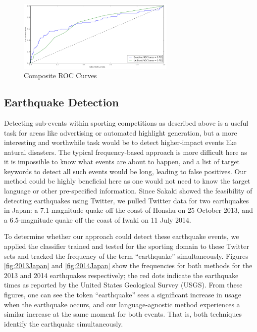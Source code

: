 \documentclass{sig-alternate}
\begin{document}
\begin{figure}[hbtp]
\begin{center}
\includegraphics[width=3in]{./figures/roc_Comp.png}
\caption{Composite ROC Curves}
\label{fig:rocComprehensive}
\end{center}
\end{figure}

\subsection{Earthquake Detection}

Detecting sub-events within sporting competitions as described above is a useful task for areas like advertising or automated highlight generation, but a more interesting and worthwhile task would be to detect higher-impact events like natural disasters.
The typical frequency-based approach is more difficult here as it is impossible to know what events are about to happen, and a list of target keywords to detect all such events would be long, leading to false positives.
Our method could be highly beneficial here as one would not need to know the target language or other pre-specified information.
Since Sakaki showed the feasibility of detecting earthquakes using Twitter, we pulled Twitter data for two earthquakes in Japan: a 7.1-magnitude quake off the coast of Honshu on 25 October 2013, and a 6.5-magnitude quake off the coast of Iwaki on 11 July 2014.

To determine whether our approach could detect these earthquake events, we applied the classifier trained and tested for the sporting domain to these Twitter sets and tracked the frequency of the term ``earthquake'' simultaneously.
Figures \ref{fig:2013Japan} and \ref{fig:2014Japan} show the frequencies for both methods for the 2013 and 2014 earthquakes respectively; the red dots indicate the earthquake times as reported by the United States Geological Survey (USGS).
From these figures, one can see the token ``earthquake'' sees a significant increase in usage when the earthquake occurs, and our language-agnostic method experiences a similar increase at the same moment for both events.
That is, both techniques identify the earthquake simultaneously.
\end{document}
